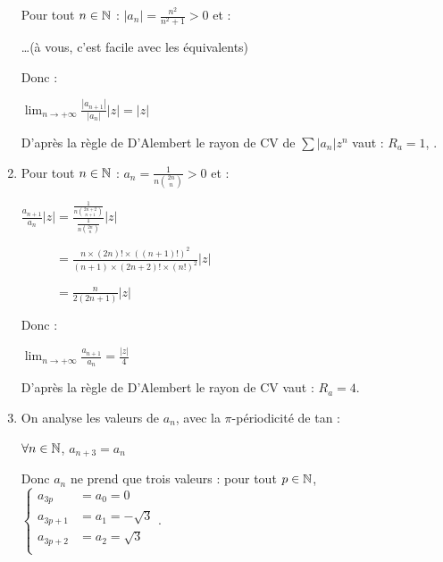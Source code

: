 \documentclass{book}
\begin{document}
\begin{Exercice}
\begin{Correction}
\begin{enumerate}
	Pour tout $n \in \mathbb{N}$ : $|a_n| = \frac{ n^2 }{ n^2 + 1 } > 0$ et :    
    
		\hspace{0.7cm} \dots (à vous, c'est facile avec les équivalents)
				
	Donc :
	
		\hspace{0.7cm} $\lim_{n \to + \infty} \frac{ |a_{n+1}| }{ |a_n| } |z| = |z|$ 
		
	D'après la règle de D'Alembert le rayon de CV de $\sum\limits |a_n| z^{n} $ vaut :
	 $R_a = 1$, .
			
	
	\item %
	Pour tout $n \in \mathbb{N}$ : $a_n = \frac{1}{ n \binom{2n}{n} } > 0$ et :
    
		\hspace{0.7cm} $\frac{ a_{n+1} }{ a_n } |z| = \frac{ \frac{ 1 }{ n \binom{2n+2}{n+1} } }{  \frac{1}{ n \binom{2n}{n} }  } |z|$

		\hspace{0.7cm} $\phantom{ \frac{ a_{n+1} }{ a_n } |z| } = \frac{ n \times (2n)! \times ((n+1)!)^2 }{ (n+1) \times (2n+2)! \times (n!)^2  } |z|$

		\hspace{0.7cm} $\phantom{ \frac{ a_{n+1} }{ a_n } |z| } = \frac{ n }{ 2 (2n+1) } |z|$
				
	Donc :
	
		\hspace{0.7cm} $\lim_{n \to + \infty} \frac{ a_{n+1} }{ a_n } = \frac{|z|}{4}$ 
		
	D'après la règle de D'Alembert le rayon de CV vaut : $R_a = 4$.



	\item %
On analyse les valeurs de $a_n$, avec la $\pi$-périodicité de tan : 

\hspace{0.7cm} $\forall n \in \mathbb{N}$, $a_{n+3} = a_n$

Donc $a_n$ ne prend que trois valeurs : pour tout $p \in \mathbb{N}$, 
$\begin{cases}
a_{3p} & = a_0 = 0 \\
a_{3p+1} & = a_1 = - \sqrt{3} \\
a_{3p+2} & = a_2 = \sqrt{3} \\
\end{cases}$.


\end{enumerate}
\end{Correction}
\end{Exercice}
\end{document}
